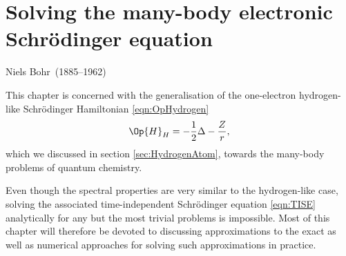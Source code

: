 \chapter{Solving the many-body electronic Schrödinger equation}
\label{ch:qchem}
{Niels Bohr~(1885--1962)} \\

\noindent
This chapter is concerned with the generalisation
of the one-electron hydrogen-like Schrödinger Hamiltonian \eqref{eqn:OpHydrogen}
\[
	\Op{H}_H = -\frac12 \Delta - \frac{Z}{r},
\]
which we discussed in section \vref{sec:HydrogenAtom},
towards the many-body problems of quantum chemistry.

Even though the spectral properties are very similar to the hydrogen-like case,
solving the associated time-independent
Schrödinger equation \eqref{eqn:TISE} analytically for
any but the most trivial problems is impossible.
Most of this chapter will therefore be devoted to
discussing approximations to the exact \TISE
as well as numerical approaches for solving such approximations
in practice.







